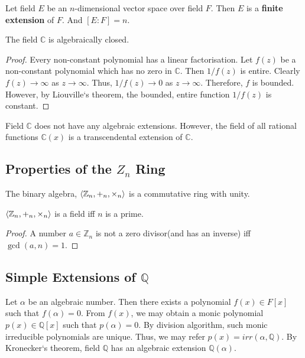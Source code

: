 \begin{definition}
	Let field $E$ be an $n$-dimensional vector space over field $F$.
	Then $E$ is a \textbf{finite extension} of $F$.
	And $[E:F] = n$.
\end{definition}

\begin{theorem}
	The field $\mathbb{C}$ is algebraically closed.
\end{theorem}
\begin{proof}
	Every non-constant polynomial has a linear factorisation.
	Let $f(z)$ be a non-constant polynomial which has no zero in $\mathbb{C}$.
	Then $1/f(z)$ is entire.
	Clearly $f(z) \to \infty$ as $z \to \infty$.
	Thus, $1/f(z) \to 0$ as $z \to \infty$.
	Therefore, $f$ is bounded.
	However, by Liouville`s theorem, the bounded, entire function $1/f(z)$ is constant.
\end{proof}

	Field $\mathbb{C}$ does not have any algebraic extensions. However, the field of all rational functions $\mathbb{C}(x)$ is a transcendental extension of $\mathbb{C}$.

\subsection{Properties of the $Z_n$ Ring}
	\par The binary algebra, $\left\langle \mathbb{Z}_n,+_n,\times_n \right\rangle$ is a commutative ring with unity. 

	\begin{theorem}
	$\left\langle \mathbb{Z}_n,+_n,\times_n \right\rangle$ is a field iff $n$ is a prime. 
	\end{theorem}
	\begin{proof}
		A number $a \in \mathbb{Z}_n$ is not a zero divisor(and has an inverse) iff $\gcd(a,n) = 1$.
	\end{proof}

\subsection{Simple Extensions of $\mathbb{Q}$}
	Let $\alpha$ be an algebraic number. Then there exists a polynomial $f(x) \in F[x]$ such that $f(\alpha) = 0$.
	From $f(x)$, we may obtain a monic polynomial $p(x) \in \mathbb{Q}[x]$ such that $p(\alpha) = 0$.
	By division algorithm, such monic irreducible polynomials are unique.
	Thus, we may refer $p(x) = irr(\alpha,\mathbb{Q})$.
	By Kronecker`s theorem, field $\mathbb{Q}$ has an algebraic extension $\mathbb{Q}(\alpha)$.
	
